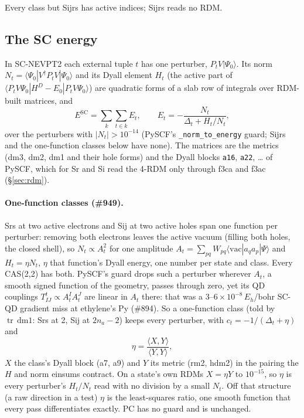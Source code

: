 \documentclass[11pt]{article}
\newcommand{\code}[1]{\texttt{#1}}
\newcommand{\tr}{\operatorname{tr}}
\begin{document}
Every class but Sijrs has active indices; Sijrs reads no RDM.

\subsection{The SC energy}

In SC-NEVPT2 each external tuple $t$ has one perturber, $P_t V|\Psi_0\rangle$.
Its norm $N_t = \langle\Psi_0|V^\dagger P_t V|\Psi_0\rangle$ and its Dyall
element $H_t$ (the active part of $\langle P_t V\Psi_0|H^D - E_0|P_t V\Psi_0\rangle$)
are quadratic forms of a slab row of integrals over RDM-built matrices, and
\begin{equation}
  E^{\mathrm{SC}} = \sum_{k}\sum_{t\in k} E_t,\qquad
  E_t = -\frac{N_t}{\Delta_t + H_t/N_t},
  \label{eq:sc}
\end{equation}
over the perturbers with $|N_t| > 10^{-14}$ (PySCF's \code{\_norm\_to\_energy}
guard; Sijrs and the one-function classes below have none). The matrices are the metrics (dm3, dm2, dm1 and
their hole forms) and the Dyall blocks \code{a16}, \code{a22}, \ldots{} of
PySCF, which for Sr and Si read the 4-RDM only through f3ca and f3ac
(\S\ref{sec:rdm}).

\paragraph{One-function classes (\#949).} Srs at two active electrons and Sij
at two active holes span one function per perturber: removing both electrons
leaves the active vacuum (filling both holes, the closed shell), so
$N_t \propto A_t^2$ for one amplitude $A_t = \sum_{pq}W_{pq}\langle\mathrm{vac}|
a_qa_p|\Psi\rangle$ and $H_t = \eta N_t$, $\eta$ that function's Dyall
energy, one number per state and class. Every CAS(2,2) has both. PySCF's
guard drops such a perturber wherever $A_t$, a smooth signed function of the
geometry, passes through zero, yet its QD couplings $T^t_{IJ} \propto
A^I_tA^J_t$ are linear in $A_t$ there: that was a $3$--$6\times10^{-8}\,E_h$/bohr
SC-QD gradient miss at ethylene's Py (\#894). So a one-function class (told by
$\tr\,\mathrm{dm1}$: Srs at 2, Sij at $2n_a - 2$) keeps every perturber,
with $c_t = -1/(\Delta_t + \eta)$ and
\begin{equation}
  \eta = \frac{\langle X, Y\rangle}{\langle Y, Y\rangle},
  \label{eq:eta}
\end{equation}
$X$ the class's Dyall block (a7, a9) and $Y$ its metric (rm2, hdm2) in the
pairing the $H$ and norm einsums contract. On a state's own RDMs $X = \eta Y$
to $10^{-15}$, so $\eta$ is every perturber's $H_t/N_t$ read with no
division by a small $N_t$. Off that structure (a raw direction in a test)
$\eta$ is the least-squares ratio, one smooth function that every pass
differentiates exactly. PC has no guard and is unchanged.
\end{document}
